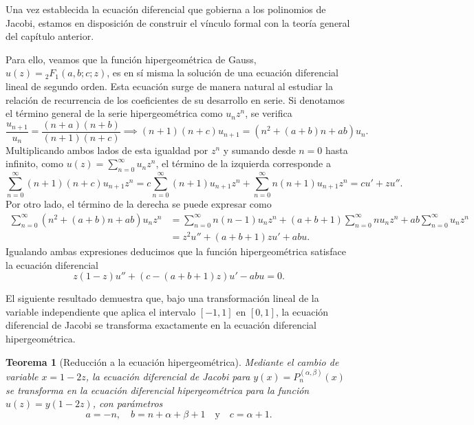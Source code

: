 \documentclass[12pt,a4paper]{book}
\newtheorem{theorem}{Teorema}
\begin{document}
Una vez establecida la ecuación diferencial que gobierna a los polinomios de Jacobi, estamos en disposición de construir el vínculo formal con la teoría general del capítulo anterior. 

Para ello, veamos que la función hipergeométrica de Gauss, $u(z) = {}_{2}F_{1}(a,b;c;z)$, es en sí misma la solución de una ecuación diferencial lineal de segundo orden. Esta ecuación surge de manera natural al estudiar la relación de recurrencia de los coeficientes de su desarrollo en serie. Si denotamos el término general de la serie hipergeométrica como $u_n z^n$, se verifica
\[
    \frac{u_{n+1}}{u_n} = \frac{(n+a)(n+b)}{(n+1)(n+c)} \implies (n+1)(n+c)u_{n+1} = (n^2 + (a+b)n + ab)u_n.
\]
Multiplicando ambos lados de esta igualdad por $z^n$ y sumando desde $n=0$ hasta infinito, como $u(z) = \sum_{n=0}^\infty u_n z^n$, el término de la izquierda corresponde a
\[
    \sum_{n=0}^\infty (n+1)(n+c)u_{n+1} z^n = c \sum_{n=0}^\infty (n+1)u_{n+1} z^n + \sum_{n=0}^\infty n(n+1)u_{n+1} z^n = c u' + z u''.
\]
Por otro lado, el término de la derecha se puede expresar como
\begin{align*}
    \sum_{n=0}^\infty (n^2 + (a+b)n + ab)u_n z^n &= \sum_{n=0}^\infty n(n-1)u_n z^n + (a+b+1)\sum_{n=0}^\infty nu_n z^n + ab\sum_{n=0}^\infty u_n z^n \\
    &= z^2 u'' + (a+b+1)z u' + ab u.
\end{align*}
Igualando ambas expresiones deducimos que la función hipergeométrica satisface la ecuación diferencial
\[
    z(1-z)u'' + (c - (a+b+1)z)u' - abu = 0.
\]

El siguiente resultado demuestra que, bajo una transformación lineal de la variable independiente que aplica el intervalo $[-1, 1]$ en $[0, 1]$, la ecuación diferencial de Jacobi se transforma exactamente en la ecuación diferencial hipergeométrica.

\begin{theorem}[Reducción a la ecuación hipergeométrica]
\label{teo:jacobi_a_hipergeometrica}
Mediante el cambio de variable $x = 1-2z$, la ecuación diferencial de Jacobi para $y(x) = P_n^{(\alpha, \beta)}(x)$ se transforma en la ecuación diferencial hipergeométrica para la función $u(z) = y(1-2z)$, con parámetros
\[
a = -n, \quad b = n+\alpha+\beta+1 \quad \text{y} \quad c = \alpha+1.
\]
\end{theorem}
\end{document}
